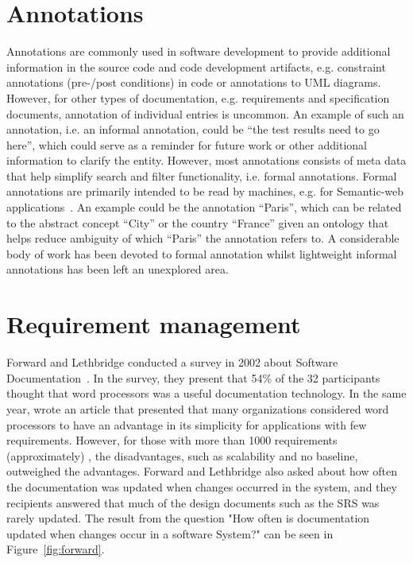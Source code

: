 \section{Annotations}
Annotations are commonly used in software development to provide additional information in the source code and code development artifacts, e.g. constraint annotations (pre-/post conditions) in code or annotations to UML diagrams.
However, for other types of documentation, e.g. requirements and specification documents, annotation of individual entries is uncommon.
An example of such an annotation, i.e. an informal annotation, could be ``the test results need to go here'', which could serve as a reminder for future work or other additional information to clarify the entity.
However, most annotations consists of meta data that help simplify search and filter functionality, i.e. formal annotations.
Formal annotations are primarily intended to be read by machines, e.g. for Semantic-web applications~\citep{uren2006semantic}.
An example could be the annotation ``Paris'', which can be related to the abstract concept ``City'' or the country ``France'' given an ontology that helps reduce ambiguity of which ``Paris'' the annotation refers to. 
A considerable body of work has been devoted to formal annotation whilst lightweight informal annotations has been left an unexplored area.

\section{Requirement management}
Forward and Lethbridge conducted a survey in 2002 about Software Documentation~\citep{forward2002}. In the survey, they present that 54\% of the 32 participants thought that word processors was a useful documentation technology. In the same year, \citet{juristo2002european} wrote an article that presented that many organizations considered word processors to have an advantage in its simplicity for applications with few requirements. However, for those with more than 1000 requirements (approximately) , the disadvantages, such as scalability and no baseline, outweighed the advantages. Forward and Lethbridge also asked about how often the documentation was updated when changes occurred in the system, and they recipients answered that much of the design documents such as the SRS was rarely updated. The result from the question "How often is documentation updated when changes occur in a software System?" can be seen in Figure~\ref{fig:forward}. 

